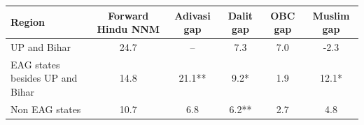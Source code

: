 \begin{tabular}{lccccc}
\hline
Region & Forward Hindu NNM & Adivasi gap & Dalit gap & OBC gap & Muslim gap \\
\hline
UP and Bihar&24.7&--&7.3&7.0&-2.3\\
EAG states besides UP and Bihar&14.8&21.1**&9.2*&1.9&12.1*\\
Non EAG states&10.7&6.8&6.2**&2.7&4.8\\
\hline
\end{tabular}
